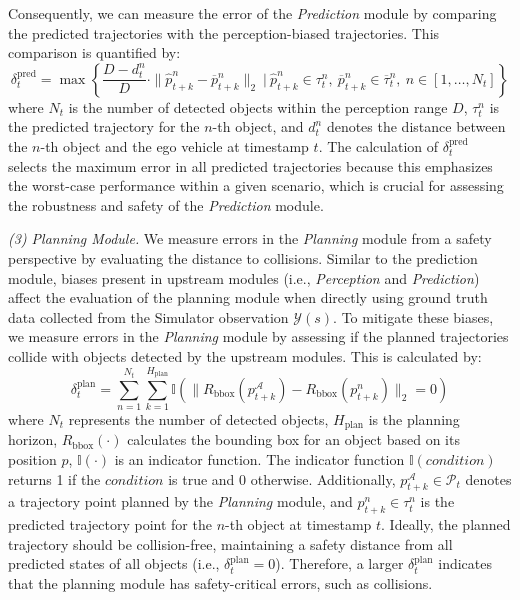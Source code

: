 Consequently, we can measure the error of the \textit{Prediction} module by comparing the predicted trajectories with the perception-biased trajectories. This comparison is quantified by:
\begin{equation}
    \delta_{t}^{\text{pred}} = \max \left\{  \frac{D-d_t^{n}}{D} \cdot \|\hat{p}^{n}_{t+k} - \overline{p}^{n}_{t+k} \|_{2} \ \big| \ \hat{p}^{n}_{t+k} \in \tau_{t}^{n}, \ \overline{p}^{n}_{t+k} \in \overline{\tau}_{t}^{n}, \ n \in [1, \dots, N_{t}] \right\}
\end{equation}
where \( N_{t} \) is the number of detected objects within the perception range \( D \), \( \tau_{t}^{n} \) is the predicted trajectory for the \( n \)-th object, and \( d_t^n \) denotes the distance between the \( n \)-th object and the ego vehicle at timestamp \( t \). The calculation of \(\delta_{t}^{\text{pred}}\) selects the maximum error in all predicted trajectories because this emphasizes the worst-case performance within a given scenario, which is crucial for assessing the robustness and safety of the \textit{Prediction} module. 

\noindent \textit{(3) Planning Module.} We measure errors in the \textit{Planning} module from a safety perspective by evaluating the distance to collisions.
Similar to the prediction module, biases present in upstream modules (i.e., \textit{Perception} and \textit{Prediction}) affect the evaluation of the planning module when directly using ground truth data collected from the Simulator observation \(\mathcal{Y}(s)\). 
To mitigate these biases, we measure errors in the \textit{Planning} module by assessing if the planned trajectories collide with objects detected by the upstream modules. This is calculated by:
\begin{equation}\label{eq:plan}
    \delta^{\text{plan}}_{t} = \sum_{n=1}^{N_{t}} \sum_{k=1}^{H_{\text{plan}}} \mathbb{I}(\| R_{\text{bbox}}(p^{\mathcal{A}}_{t+k}) - R_{\text{bbox}}(p_{t+k}^{n}) \|_{2}=0)
\end{equation}
where \( N_{t} \) represents the number of detected objects, \( H_{\text{plan}} \) is the planning horizon, \( R_{\text{bbox}}(\cdot) \) calculates the bounding box for an object based on its position \( p \), \( \mathbb{I}(\cdot) \) is an indicator function. The indicator function \( \mathbb{I}(condition) \) returns 1 if the \( condition \) is true and 0 otherwise. Additionally, \( p^{\mathcal{A}}_{t+k} \in \mathcal{P}_{t} \) denotes a trajectory point planned by the \textit{Planning} module, and \( p_{t+k}^{n} \in \tau_{t}^{n} \) is the predicted trajectory point for the \( n \)-th object at timestamp \( t \). Ideally, the planned trajectory should be collision-free, maintaining a safety distance from all predicted states of all objects (i.e., \(\delta^{\text{plan}}_{t} = 0\)). Therefore, a larger \(\delta^{\text{plan}}_{t}\) indicates that the planning module has safety-critical errors, such as collisions.


